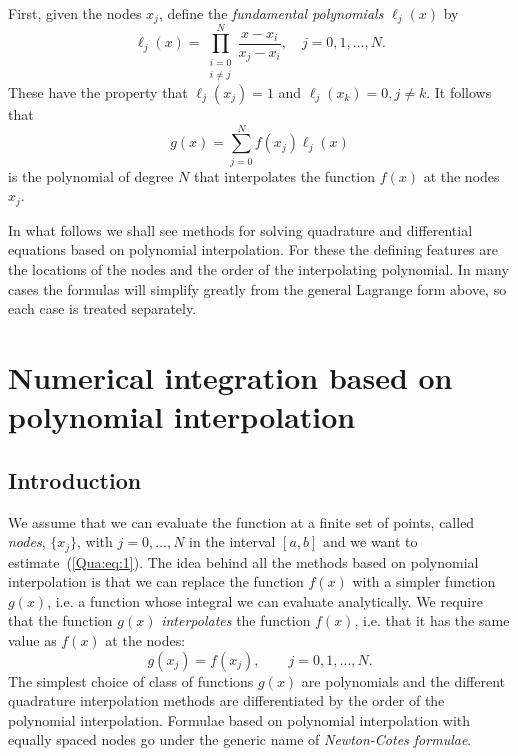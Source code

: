 First, given the nodes $x_j$, define the \textit{fundamental
  polynomials} $\ell_j(x)$ by
%
\begin{equation}
  \ell_j(x) = \prod_{\substack{i = 0\\i \ne j}}^N \frac{x - x_i}{x_j -
    x_i}, \quad j = 0, 1, \dots, N.
\end{equation}
%
These have the property that $\ell_j(x_j) = 1$ and $\ell_j(x_k) = 0, j
\ne k$. It follows that
%
\begin{equation}
  g(x) = \sum_{j=0}^N f(x_j) \ell_j(x)
\end{equation}
%
is the polynomial of degree $N$ that interpolates the function $f(x)$
at the nodes $x_j$.

In what follows we shall see methods for solving quadrature and
differential equations based on polynomial interpolation. For these
the defining features are the locations of the nodes and the order of
the interpolating polynomial. In many cases the formulas will simplify
greatly from the general Lagrange form above, so each case is treated
separately.

\section[Using polynomial interpolation]{Numerical integration based on polynomial interpolation}

\subsection{Introduction}

We assume that we can evaluate the function at a finite set of points,
called \textit{nodes}, $\{x_j\}$, with $j=0,\ldots, N$ in the interval
$[a,b]$ and we want to estimate~(\ref{Qua:eq:1}).  The idea behind all
the methods based on polynomial interpolation is that we can replace
the function $f(x)$ with a simpler function $g(x)$, i.e. a function
whose integral we can evaluate analytically.  We require that the
function $g(x)$ \textit{interpolates} the function $f(x)$, i.e. that
it has the same value as $f(x)$ at the nodes:
%
\begin{equation}
  g(x_j) = f(x_j) , \qquad j = 0,1,\ldots,N. \label{Qua:eq:3}
\end{equation}
%
The simplest choice of class of functions $g(x)$ are polynomials and
the different quadrature interpolation methods are differentiated by
the order of the polynomial interpolation.  Formulae based on
polynomial interpolation with equally spaced nodes go under the
generic name of \textit{Newton-Cotes formulae}.

